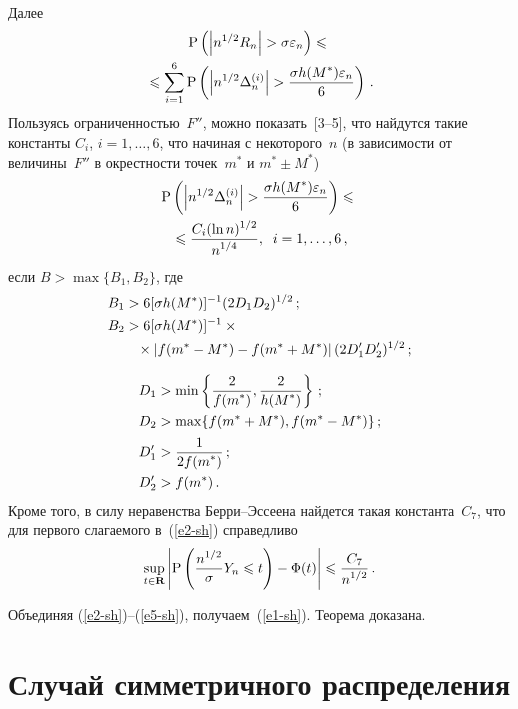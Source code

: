 \begin{multicols}{2}
\begin{align*}
\end{align*}
Далее
\begin{multline}
\mbox{P}\left(\left\vert n^{1/2}R_n\right\vert>\sigma\varepsilon_n\right)\leqslant{}\\
{}\leqslant
\sum\limits_{i=1}^{6}\mbox{P}\left(\left\vert n^{1/2}\Delta_n^{(i)}\right\vert>\displaystyle\frac{\displaystyle \sigma h(M^*)\varepsilon_n\mathstrut}{\displaystyle 6\mathstrut}\right)\,.
\label{e3-sh}
\end{multline}
Пользуясь ограниченностью~$F''$, можно показать~[3--5], что найдутся
такие константы $C_i$, $i=1,\ldots,6$, что начиная с некоторого~$n$
(в зависимости от величины~$F''$ в окрестности точек~$m^*$ и $m^*\pm
M^*$)
\begin{multline}
\mbox{P}\left(\left\vert n^{1/2}\Delta_n^{(i)}\right\vert>\displaystyle\frac{\displaystyle \sigma h(M^*)\varepsilon_n\mathstrut}{\displaystyle 6\mathstrut}\right)\leqslant{}\\
{}\leqslant\displaystyle\frac{\displaystyle C_i(\ln n)^{1/2}\mathstrut}{\displaystyle n^{1/4}\mathstrut},\;\;i=1,\ldots,6\,,
\label{e4-sh}
\end{multline}
если $B>\max\{B_1,B_2\}$, где 
\begin{align*}
B_1&>6[\sigma h(M^*)]^{-1}(2D_1 D_2)^{1/2}\,;\\
B_2&>6[\sigma h(M^*)]^{-1}\times{}\\
&\hspace*{3mm}{}\times\left\vert f(m^*-M^*)-f(m^*+M^*)\right\vert(2D'_1 D'_2)^{1/2}\,;
\end{align*}

\noindent
\begin{align*}
D_1&>\min\left\{\displaystyle\frac{\displaystyle 2\mathstrut}{\displaystyle f(m^*)\mathstrut},\displaystyle\frac{\displaystyle 2\mathstrut}{\displaystyle h(M^*)\mathstrut}\right\}\,;\\
D_2&>\max\{f(m^*+M^*),f(m^*-M^*)\}\,;\\
D'_1&>\displaystyle\frac{\displaystyle 1\mathstrut}{\displaystyle 2f(m^*)\mathstrut}\,;\\
D'_2&>f(m^*)\,.
\end{align*}
Кроме того, в силу неравенства Берри--Эссеена найдется такая константа~$C_7$, что для 
первого слагаемого в~(\ref{e2-sh}) справедливо
\begin{equation}
\sup\limits_{t\in\mathbf{R}}\left\vert\mbox{P}\left(\displaystyle\frac{\displaystyle n^{1/2}\mathstrut}{\displaystyle \sigma\mathstrut}Y_n\leqslant t\right)-
\Phi(t)\right\vert\leqslant\displaystyle\frac{\displaystyle C_7\mathstrut}{\displaystyle n^{1/2}\mathstrut}\,.
\label{e5-sh}
\end{equation}

Объединяя (\ref{e2-sh})--(\ref{e5-sh}), получаем~(\ref{e1-sh}). Теорема доказана.


\section{Случай симметричного распределения}


\end{multicols}
